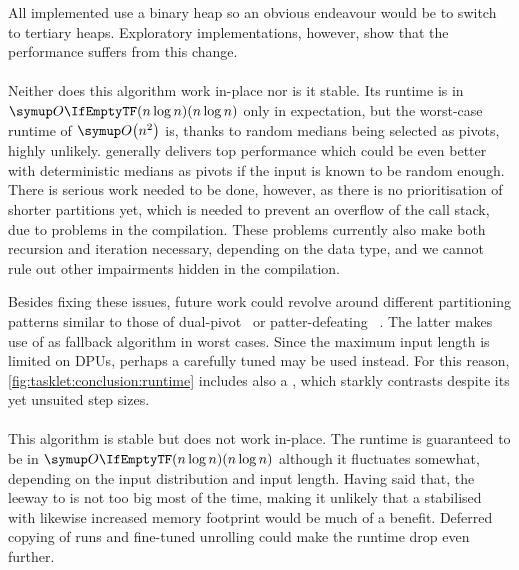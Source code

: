 All implemented \HS*{} use a binary heap so an obvious endeavour would be to switch to tertiary heaps.
Exploratory implementations, however, show that the performance suffers from this change.


\paragraph{\QS{}}
Neither does this algorithm work in-place nor is it stable.
Its runtime is in \(\bigoh{n \log n}\) only in expectation, but the worst-case runtime of \(\bigoh*{n^2}\) is, thanks to random medians being selected as pivots, highly unlikely.
\QS{} generally delivers top performance which could be even better with deterministic medians as pivots if the input is known to be random enough.
There is serious work needed to be done, however, as there is no prioritisation of shorter partitions yet, which is needed to prevent an overflow of the call stack, due to problems in the compilation.
These problems currently also make both recursion and iteration necessary, depending on the data type, and we cannot rule out other impairments hidden in the compilation.

Besides fixing these issues, future work could revolve around different partitioning patterns similar to those of dual-pivot~\cite{wild2012averagecase} or patter-defeating \QS{}~\cite{peters2021patterndefeatingquicksort}.
The latter makes use of \HS{} as fallback algorithm in worst cases.
Since the maximum input length is limited on DPUs, perhaps a carefully tuned \ShS{} may be used instead.
For this reason, \cref{fig:tasklet:conclusion:runtime} includes also a \ShS{}, which starkly contrasts \HS{} despite its yet unsuited step sizes.


\paragraph{\MS{}}
This algorithm is stable but does not work in-place.
The runtime is guaranteed to be in \(\bigoh{n \log n}\) although it fluctuates somewhat, depending on the input distribution and input length.
Having said that, the leeway to \QS{} is not too big most of the time, making it unlikely that a stabilised \QS{} with likewise increased memory footprint would be much of a benefit.
Deferred copying of runs and fine-tuned unrolling could make the runtime drop even further.

